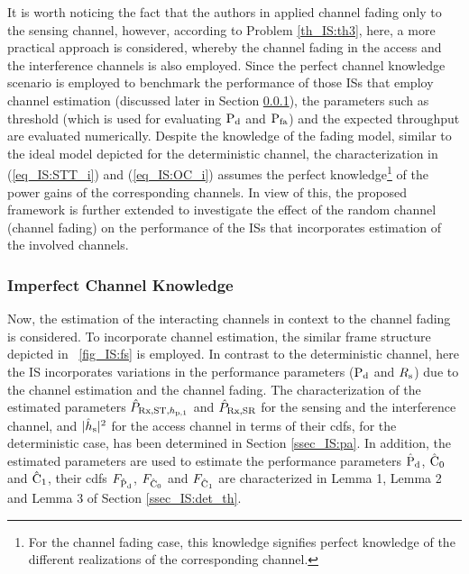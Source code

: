 \begin{remark} \label{rem_IS:rem3}
\normalfont

It is worth noticing the fact that the authors in \cite{Juarez11} applied channel fading only to the sensing channel, however, according to Problem \ref{th_IS:th3}, here, a more practical approach is considered, whereby the channel fading in the access and the interference channels is also employed. Since the perfect channel knowledge scenario is employed to benchmark the performance of those ISs that employ channel estimation (discussed later in Section \ref{ssec_IS:ice}), the parameters such as threshold (which is used for evaluating $\text{P}_{\text{d}}$ and $\text{P}_{\text{fa}}$) and the expected throughput are evaluated numerically.
Despite the knowledge of the fading model, similar to the ideal model depicted for the deterministic channel, the characterization in (\ref{eq_IS:STT_i}) and (\ref{eq_IS:OC_i}) assumes the perfect knowledge\footnote{For the channel fading case, this knowledge signifies perfect knowledge of the different realizations of the corresponding channel.} of the power gains of the corresponding channels. In view of this, the proposed framework is further extended to investigate the effect of the random channel (channel fading) on the performance of the ISs that incorporates estimation of the involved channels.


\end{remark}

\subsubsection{Imperfect Channel Knowledge} \label{ssec_IS:ice}
Now, the estimation of the interacting channels in context to the channel fading is considered. To incorporate channel estimation, the similar frame structure depicted in \figurename~\ref{fig_IS:fs} is employed. In contrast to the deterministic channel, here the IS incorporates variations in the performance parameters ($\text{P}_{\text{d}}$ and $R_{\text{s}}$) due to the channel estimation and the channel fading. 
The characterization of the estimated parameters $\hat{P}_{\text{Rx,ST,$h_{\text{p,1}}$}}$ and $\hat{P}_{\text{Rx,SR}}$ for the sensing and the interference channel, and $|\hat{h}_{\text{s}}|^2$ for the access channel in terms of their cdfs, for the deterministic case, has been determined in Section \ref{ssec_IS:pa}. In addition, the estimated parameters are used to estimate the performance parameters $\hat{\text{P}}_{\text{d}}$, $\hat{\text{C}}_{\text{0}}$ and $\hat{\text{C}}_{\text{1}}$, their cdfs $F_{\hat{\text{P}}_{\text{d}}}$, $F_{\hat{\text{C}}_{\text{0}}}$ and $F_{\hat{\text{C}}_{\text{1}}}$ are characterized in Lemma 1, Lemma 2 and Lemma 3 of Section \ref{ssec_IS:det_th}.


